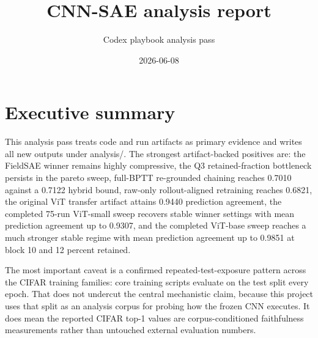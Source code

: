 \documentclass[11pt]{article}
\title{CNN-SAE analysis report}
\author{Codex playbook analysis pass}
\date{2026-06-08}
\begin{document}
\maketitle
\tableofcontents
\section{Executive summary}
This analysis pass treats code and run artifacts as primary evidence and writes all new outputs under analysis/. The strongest artifact-backed positives are: the FieldSAE winner remains highly compressive, the Q3 retained-fraction bottleneck persists in the pareto sweep, full-BPTT re-grounded chaining reaches 0.7010 against a 0.7122 hybrid bound, raw-only rollout-aligned retraining reaches 0.6821, the original ViT transfer artifact attains 0.9440 prediction agreement, the completed 75-run ViT-small sweep recovers stable winner settings with mean prediction agreement up to 0.9307, and the completed ViT-base sweep reaches a much stronger stable regime with mean prediction agreement up to 0.9851 at block 10 and 12 percent retained.


The most important caveat is a confirmed repeated-test-exposure pattern across the CIFAR training families: core training scripts evaluate on the test split every epoch. That does not undercut the central mechanistic claim, because this project uses that split as an analysis corpus for probing how the frozen CNN executes. It does mean the reported CIFAR top-1 values are corpus-conditioned faithfulness measurements rather than untouched external evaluation numbers.
\end{document}
